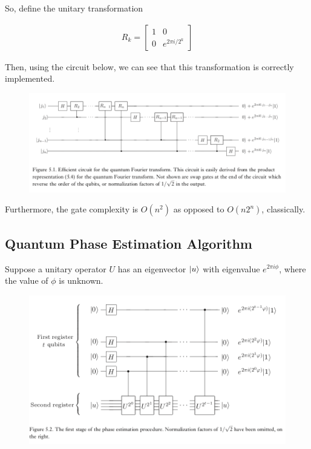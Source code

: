 \documentclass[main.tex]{subfiles}
\begin{document}
\begin{subappendices}
So, define the unitary transformation

\begin{align}
	R_k = \begin{bmatrix}
 1 & 0 \\ 0 & e^{2\pi i / 2^k}	
 \end{bmatrix}
\end{align}

Then, using the circuit below, we can see that this transformation is correctly implemented.

\begin{figure}[H]
\centering
\includegraphics[width=\linewidth]{images/qfft.png}	
\end{figure}

Furthermore, the gate complexity is $O(n^2)$ as opposed to $O(n2^n)$, classically. 

\subsection{Quantum Phase Estimation Algorithm}\label{phase_estimation}

Suppose a unitary operator $U$ has an eigenvector $\ket{u}$ with eigenvalue $e^{2\pi i \phi}$, where the value of $\phi$ is unknown. 

\begin{figure}[H]
\centering
\includegraphics[width=\linewidth]{images/phase_estim.png}	
\end{figure}


\end{subappendices}
\end{document}
